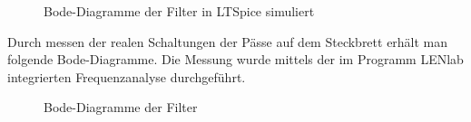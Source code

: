 \begin{figure}[H]
\caption{Bode-Diagramme der Filter in LTSpice simuliert}
\label{Bode Spice}
\end{figure}
Durch messen der realen Schaltungen der Pässe auf dem Steckbrett erhält man folgende Bode-Diagramme. Die Messung wurde mittels der im Programm LENlab integrierten Frequenzanalyse durchgeführt.
\begin{figure}[H]
\caption{Bode-Diagramme der Filter}
\label{Bode LENlab}
\end{figure}

